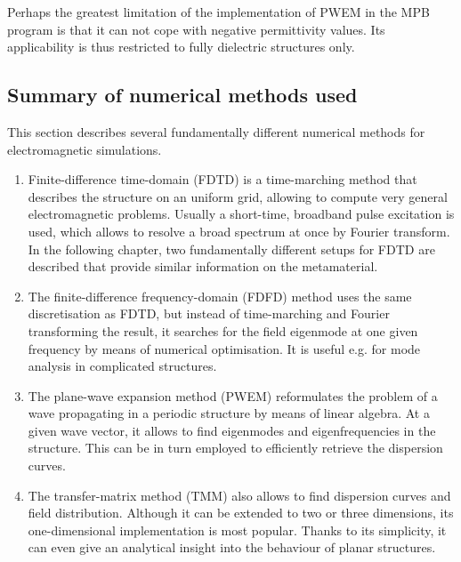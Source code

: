 Perhaps the greatest limitation of the implementation of PWEM in the MPB program is that it can not cope with negative permittivity values. Its applicability is thus restricted to fully dielectric structures only.	


\subsection{Summary of numerical methods used} %
This section describes several fundamentally different numerical methods for electromagnetic simulations. 
\begin{enumerate}
\item{Finite-difference time-domain (FDTD) is a time-marching method that describes the structure on an uniform grid, allowing to compute very general electromagnetic problems. Usually a short-time, broadband pulse excitation is used, which allows to resolve a broad spectrum at once by Fourier transform. In the following chapter, two fundamentally different setups for FDTD are described that provide similar information on the metamaterial.} 
\item{The finite-difference frequency-domain (FDFD) method uses the same discretisation as FDTD, but instead of time-marching and Fourier transforming the result, it searches for the field eigenmode at one given frequency by means of numerical optimisation. It is useful e.g. for mode analysis in complicated structures.} 
\item{The plane-wave expansion method (PWEM) reformulates the problem of a wave propagating in a periodic structure by means of linear algebra. At a given wave vector, it allows to find eigenmodes and eigenfrequencies in the structure. This can be in turn employed to efficiently retrieve the dispersion curves.} 
\item{The transfer-matrix method (TMM) also allows to find dispersion curves and field distribution. Although it can be extended to two or three dimensions, its one-dimensional implementation is most popular. Thanks to its simplicity, it can even give an analytical insight into the behaviour of planar structures.} 
\end{enumerate}

